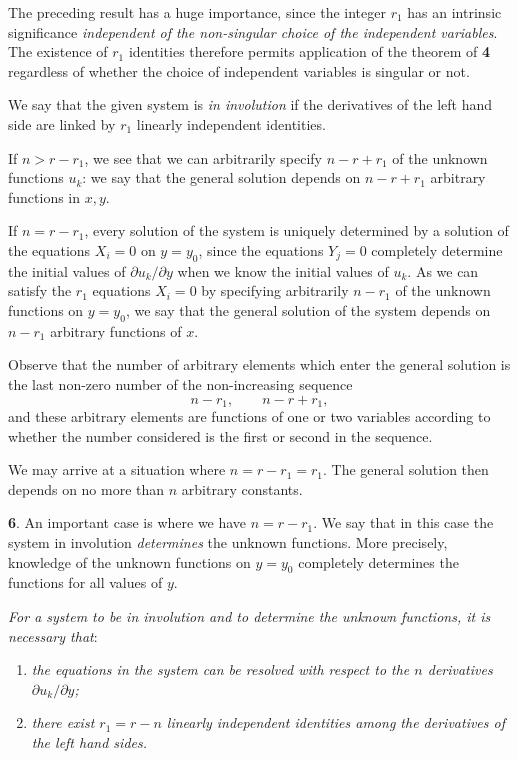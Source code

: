 \documentclass[leqno,11pt]{article}
\newcommand{\pd}{\partial}
\theoremstyle{shape1}
\theoremstyle{shape0}
\theoremstyle{shape2}
\theoremstyle{definition}
\begin{document}
The preceding result has a huge importance, since the integer $r_{1}$ has an intrinsic significance \emph{independent of the non-singular choice of the independent variables}. The existence of $r_{1}$ identities therefore permits application of the theorem of \textsection\textbf{4} regardless of whether the choice of independent variables is singular or not.

We say that the given system is \emph{in involution} if the derivatives of the left hand side are linked by $r_{1}$ linearly independent identities.

If $n>r-r_{1}$, we see that we can arbitrarily specify $n-r+r_{1}$ of the unknown functions $u_{k}$: we say that the general solution depends on $n-r+r_{1}$ arbitrary functions in $x, y$.

If $n=r-r_{1}$, every solution of the system is uniquely determined by a solution of the equations $X_{i}=0$ on $y=y_{0}$, since the equations $Y_{j}=0$ completely determine the initial values of $\pd u_{k}/\pd y$ when we know the initial values of $u_{k}$. As we can satisfy the $r_{1}$ equations $X_{i}=0$ by specifying arbitrarily $n-r_{1}$ of the unknown functions on $y=y_{0}$, we say that the general solution of the system depends on $n-r_{1}$ arbitrary functions of $x$.

Observe that the number of arbitrary elements which enter the general solution is the last non-zero number of the non-increasing sequence
\[
n-r_{1},\qquad n-r+r_{1},
\]
and these arbitrary elements are functions of one or two variables according to whether the number considered is the first or second in the sequence.

We may arrive at a situation where $n=r-r_{1}=r_{1}$. The general solution then depends on no more than $n$ arbitrary constants.

\vspace{12pt}

\textbf{6}. An important case is where we have $n=r-r_{1}$. We say that in this case the system in involution \emph{determines} the unknown functions. More precisely, knowledge of the unknown functions on $y=y_{0}$ completely determines the functions for all values of $y$.

\emph{For a system to be in involution and to determine the unknown functions, it is necessary that}:
\begin{enumerate}
\item \emph{the equations in the system can be resolved with respect to the $n$ derivatives $\pd u_{k}/\pd y$;}
\item \emph{there exist $r_{1}=r-n$ linearly independent identities among the derivatives of the left hand sides.}
\end{enumerate}
\end{document}
